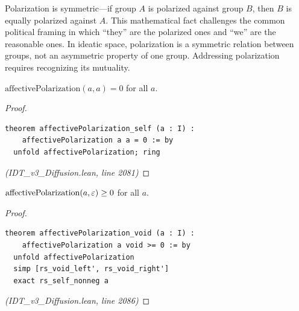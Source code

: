 \begin{interpretation}
Polarization is symmetric---if group $A$ is polarized against group $B$, then
$B$ is equally polarized against $A$. This mathematical fact challenges the
common political framing in which ``they'' are the polarized ones and ``we'' are
the reasonable ones. In ideatic space, polarization is a symmetric relation
between groups, not an asymmetric property of one group. Addressing polarization
requires recognizing its mutuality.
\end{interpretation}

\begin{theorem}
\label{thm:affective-self-zero}
$\mathrm{affectivePolarization}(a, a) = 0$ for all $a$.
\end{theorem}

\begin{proof}
\begin{lstlisting}
theorem affectivePolarization_self (a : I) :
    affectivePolarization a a = 0 := by
  unfold affectivePolarization; ring
\end{lstlisting}
\textit{(IDT\_v3\_Diffusion.lean, line 2081)}
\end{proof}

\begin{theorem}
\label{thm:affective-void}
$\mathrm{affectivePolarization}(a, \varepsilon) \geq 0$ for all $a$.
\end{theorem}

\begin{proof}
\begin{lstlisting}
theorem affectivePolarization_void (a : I) :
    affectivePolarization a void >= 0 := by
  unfold affectivePolarization
  simp [rs_void_left', rs_void_right']
  exact rs_self_nonneg a
\end{lstlisting}
\textit{(IDT\_v3\_Diffusion.lean, line 2086)}
\end{proof}

